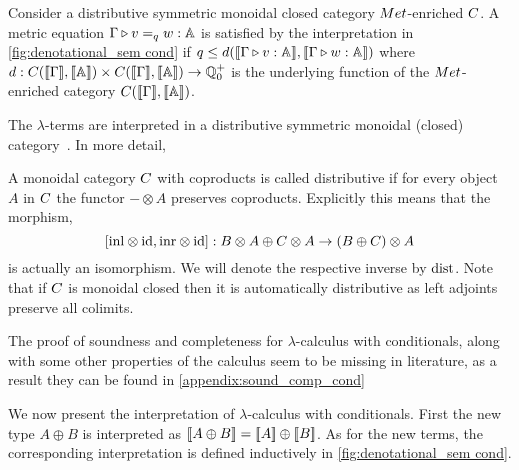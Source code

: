 \documentclass[a4paper,UKenglish,cleveref, autoref, thm-restate]{lipics-v2021}
\begin{document}
Consider a distributive symmetric monoidal closed category $\catMet$-enriched $\catC$. A metric equation $\Gamma \triangleright v =_{q} w : \mathbb{A} $ is satisfied by the interpretation in \autoref{fig:denotational_sem cond} if $q \leq d( \llbracket \Gamma  \triangleright v : \mathbb{A} \rrbracket, \llbracket\Gamma \triangleright w : \mathbb{A} \rrbracket)$ where $d : \catC(\llbracket \Gamma \rrbracket, \llbracket \typeA \rrbracket) \times \catC(\llbracket \Gamma \rrbracket, \llbracket \typeA \rrbracket) \rightarrow \mathbb{Q}_0^+$ is the underlying function of the $\catMet$-enriched category   $\catC(\llbracket \Gamma \rrbracket, \llbracket \typeA \rrbracket)$.


    The $\lambda$-terms are interpreted in a distributive symmetric
monoidal (closed) category~\cite{maclane13}. In more detail, 
\begin{definition}
        A monoidal category $\catC$ with coproducts is called
        distributive if for every object $A$ in $\catC$ the
        functor $- \otimes A$ preserves coproducts. Explicitly
        this means that the morphism,
        \[
                [\mathrm{inl} \otimes \mathrm{id}, \mathrm{inr} \otimes \mathrm{id}] : B \otimes A \oplus C \otimes                     A \to (B \oplus C) \otimes A
        \]
        is actually an isomorphism. We will denote the respective inverse
        by $\mathrm{dist}$. Note that if $\catC$ is monoidal closed then it is automatically
        distributive as left adjoints preserve all colimits.
\end{definition}

The proof of soundness and completeness for $\lambda$-calculus with conditionals, along with some other properties of the calculus seem to be missing in literature, as a result they can be found in \autoref{appendix:sound_comp_cond}

We now present the interpretation of $\lambda$-calculus with conditionals.
First the new type $A \oplus B$ is interpreted as $\left \llbracket A \oplus B \right \rrbracket = [\![A
]\!] \oplus [\![ B ]\!]$. As for the new terms, the corresponding
interpretation is defined inductively in \autoref{fig:denotational_sem cond}.
\end{document}
